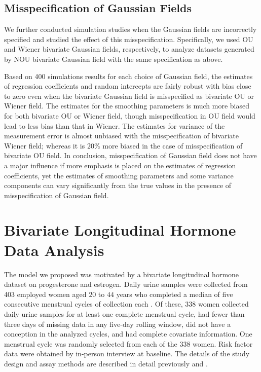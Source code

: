 \documentclass[12pt, notitlepage]{article}
\begin{document}
\subsection{Misspecification of Gaussian Fields}

We further conducted simulation studies when the Gaussian fields are incorrectly specified and studied the effect of this misspecification. Specifically, we used OU and Wiener bivariate Gaussian fields, respectively, to analyze datasets generated by NOU bivariate Gaussian field with the same specification as above.

Based on 400 simulations results for each choice of Gaussian field, the estimates of regression coefficients and random intercepts are fairly robust with bias close to zero even when the bivariate Gaussian field is misspecified as bivariate OU or Wiener field. The estimates for the smoothing parameters is much more biased for both bivariate OU or Wiener field, though misspecification in OU field would lead to less bias than that in Wiener. The estimates for variance of the measurement error is almost unbiased with the misspecification of bivariate Wiener field; whereas it is $20\%$ more biased in the case of misspecification of bivariate OU field. In conclusion, misspecification of Gaussian field does not  have a major influence if more emphasis is placed on the estimates of regression coefficients, yet the estimates of smoothing parameters and some variance components can vary significantly from the true values in the presence of misspecification of Gaussian field. 
%
%
%

\section{Bivariate Longitudinal Hormone Data Analysis} \label{dataAnalysis}

The model we proposed was motivated by a bivariate longitudinal hormone dataset on progesterone and estrogen.
Daily urine samples were collected from 403 employed women aged $20$ to $44$ years who completed a median of five consecutive menstrual cycles of collection each \cite{Gold:Eske:Lasl:Samu:O'Nei:Over:Sche:quan:1995}. Of these, $338$ women collected daily urine samples for at least one complete menstrual cycle, had fewer than three days of missing data in any five-day rolling window, did not have a conception in the analyzed cycles, and had complete covariate information. One menstrual cycle was randomly selected from each of the $338$ women. 
Risk factor data were obtained by in-person interview at baseline. The details of the study design and assay methods are described in detail previously \cite{Gold:Eske:Lasl:Samu:O'Nei:Over:Sche:quan:1995} and \cite{Gold:Eske:Hamm:Lasl:Samu:O'Nei:Hine:Over:Sche:quan:1995}. 
\end{document}
